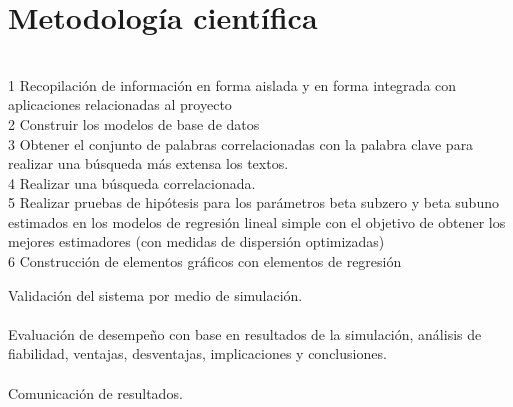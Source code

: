 \section {Metodología científica}
\ \\
1 Recopilación de información en forma aislada y en forma integrada con aplicaciones relacionadas al proyecto\\
2 Construir los modelos de base de datos\\
3 Obtener el conjunto de palabras correlacionadas con la palabra clave para realizar una búsqueda más extensa los textos.\\
4 Realizar una búsqueda correlacionada.\\
5 Realizar pruebas de hipótesis para los parámetros beta subzero y beta subuno estimados en los modelos de regresión lineal simple con el objetivo de obtener los mejores estimadores (con medidas de dispersión optimizadas)\\
6 Construcción de elementos gráficos con elementos de regresión

Validación del sistema por medio de simulación.\\\\
Evaluación de desempeño con base en resultados de la simulación, análisis de fiabilidad, ventajas, desventajas, implicaciones y conclusiones.\\\\
Comunicación de resultados.